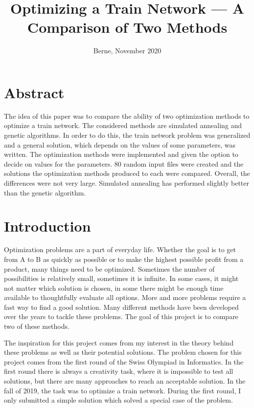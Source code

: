 \documentclass[10pt]{scrreprt}
\title{Optimizing a Train Network --- A Comparison of Two Methods\\
}
\date{Berne, November 2020}
\begin{document}
\maketitle


\chapter{Abstract}
The idea of this paper was to compare the ability of two optimization methods to optimize a train network. The considered methods are simulated annealing and genetic algorithms. In order to do this, the train network problem was generalized and a general solution, which depends on the values of some parameters, was written. The optimization methods were implemented and given the option to decide on values for the parameters. 80 random input files were created and the solutions the optimization methods produced to each were compared. Overall, the differences were not very large. Simulated annealing has performed slightly better than the genetic algorithm.

\newpage

\tableofcontents

\newpage

\chapter{Introduction}

Optimization problems are a part of everyday life. Whether the goal is to get from A to B as quickly as possible or to make the highest possible profit from a product, many things need to be optimized. Sometimes the number of possibilities is relatively small, sometimes it is infinite. In some cases, it might not matter which solution is chosen, in some there might be enough time available to thoughtfully evaluate all options. More and more problems require a fast way to find a good solution. Many different methods have been developed over the years to tackle these problems. The goal of this project is to compare two of these methods.

The inspiration for this project comes from my interest in the theory behind these problems as well as their potential solutions. The problem chosen for this project comes from the first round of the Swiss Olympiad in Informatics. In the first round there is always a creativity task, where it is impossible to test all solutions, but there are many approaches to reach an acceptable solution. In the fall of 2019, the task was to optimize a train network. During the first round, I only submitted a simple solution which solved a special case of the problem.
\end{document}
